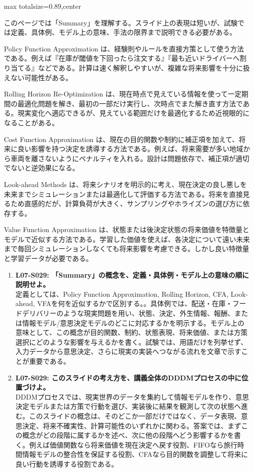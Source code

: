 \begin{minipage}[t]{0.58\textwidth}
\begin{adjustbox}{max totalsize={\textwidth}{0.89\textheight},center}
\begin{minipage}{\textwidth}\scriptsize
{}このページでは「Summary」を理解する。スライド上の表現は短いが、試験では定義、具体例、モデル上の意味、手法の限界まで説明できる必要がある。\par
Policy Function Approximation は、経験則やルールを直接方策として使う方法である。例えば『在庫が閾値を下回ったら注文する』『最も近いドライバーへ割り当てる』などである。計算は速く解釈しやすいが、複雑な将来影響を十分に扱えない可能性がある。\par
Rolling Horizon Re-Optimization は、現在時点で見えている情報を使って一定期間の最適化問題を解き、最初の一部だけ実行し、次時点でまた解き直す方法である。現実変化へ適応できるが、見えている範囲だけを最適化するため近視眼的になることがある。\par
Cost Function Approximation は、現在の目的関数や制約に補正項を加えて、将来に良い影響を持つ決定を誘導する方法である。例えば、将来需要が多い地域から車両を離さないようにペナルティを入れる。設計は問題依存で、補正項が適切でないと逆効果になる。\par
Look-ahead Methods は、将来シナリオを明示的に考え、現在決定の良し悪しを未来までシミュレーションまたは最適化して評価する方法である。将来を直接見るため直感的だが、計算負荷が大きく、サンプリングやホライズンの選び方に依存する。\par
Value Function Approximation は、状態または後決定状態の将来価値を特徴量とモデルで近似する方法である。学習した価値を使えば、各決定について遠い未来まで毎回シミュレーションしなくても将来影響を考慮できる。しかし良い特徴量と学習データが必要である。\par{}\begin{enumerate}\item \textbf{L07-S029: 「Summary」の概念を、定義・具体例・モデル上の意味の順に説明せよ。}\\定義としては、Policy Function Approximation, Rolling Horizon, CFA, Look-ahead, VFAを何を近似するかで区別する。。具体例では、配送・在庫・フードデリバリーのような現実問題を用い、状態、決定、外生情報、報酬、または情報モデル/意思決定モデルのどこに対応するかを明示する。モデル上の意味として、この概念が目的関数、制約、状態表現、将来価値、または方策選択にどのような影響を与えるかを書く。試験では、用語だけを列挙せず、入力データから意思決定、さらに現実の実装へつながる流れを文章で示すことが重要である。\item \textbf{L07-S029: このスライドの考え方を、講義全体のDDDMプロセスの中に位置づけよ。}\\DDDMプロセスでは、現実世界のデータを集約して情報モデルを作り、意思決定モデルまたは方策で行動を選び、実装後に結果を観測して次の状態へ進む。このスライドの概念は、そのどこか一部だけではなく、データ表現、意思決定、将来不確実性、計算可能性のいずれかに関わる。答案では、まずこの概念がどの段階に属するかを述べ、次に他の段階へどう影響するかを書く。例えば価値関数なら将来価値を現在決定へ戻す役割、FIFOなら旅行時間情報モデルの整合性を保証する役割、CFAなら目的関数を調整して将来に良い行動を誘導する役割である。\end{enumerate}

\end{minipage}
\end{adjustbox}
\end{minipage}
